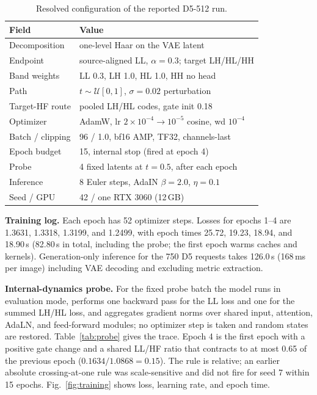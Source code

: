 \documentclass[conference]{IEEEtran}
\begin{document}
\begin{table}[t]
\centering
\caption{Resolved configuration of the reported D5-512 run.}
\label{tab:config}
\footnotesize
\begin{tabular}{@{}ll@{}}
\toprule
Field & Value \\
\midrule
Decomposition & one-level Haar on the VAE latent \\
Endpoint & source-aligned LL, $\alpha=0.3$; target LH/HL/HH \\
Band weights & LL 0.3, LH 1.0, HL 1.0, HH no head \\
Path & $t\sim\mathcal U[0,1]$, $\sigma=0.02$ perturbation \\
Target-HF route & pooled LH/HL codes, gate init 0.18 \\
Optimizer & AdamW, lr $2\times10^{-4}\!\to\!10^{-5}$ cosine, wd $10^{-4}$ \\
Batch / clipping & 96 / 1.0, bf16 AMP, TF32, channels-last \\
Epoch budget & 15, internal stop (fired at epoch 4) \\
Probe & 4 fixed latents at $t=0.5$, after each epoch \\
Inference & 8 Euler steps, AdaIN $\beta=2.0$, $\eta=0.1$ \\
Seed / GPU & 42 / one RTX 3060 (12\,GB) \\
\bottomrule
\end{tabular}
\end{table}

\noindent\textbf{Training log.} Each epoch has 52 optimizer steps. Losses for epochs 1--4 are
1.3631, 1.3318, 1.3199, and 1.2499, with epoch times 25.72, 19.23, 18.94, and 18.90\,s
(82.80\,s in total, including the probe; the first epoch warms caches and kernels).
Generation-only inference for the 750 D5 requests takes 126.0\,s (168\,ms per image) including
VAE decoding and excluding metric extraction.

\noindent\textbf{Internal-dynamics probe.} For the fixed probe batch the model runs in evaluation
mode, performs one backward pass for the LL loss and one for the summed LH/HL loss, and
aggregates gradient norms over shared input, attention, AdaLN, and feed-forward modules; no
optimizer step is taken and random states are restored. Table~\ref{tab:probe} gives the trace.
Epoch 4 is the first epoch with a positive gate change and a shared LL/HF ratio that contracts to
at most 0.65 of the previous epoch ($0.1634/1.0868=0.15$). The rule is relative; an earlier
absolute crossing-at-one rule was scale-sensitive and did not fire for seed 7 within 15 epochs.
Fig.~\ref{fig:training} shows loss, learning rate, and epoch time.
\end{document}
